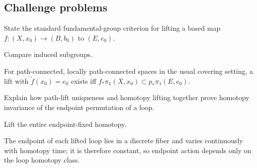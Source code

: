 \subsection*{Challenge problems}

\begin{exercise}\label{exr:viii11-ped-15}
State the standard fundamental-group criterion for lifting a based map $f:(X,x_0)\to(B,b_0)$ to $(E,e_0)$.
\end{exercise}
\begin{hint}
Compare induced subgroups.
\end{hint}
\begin{solution}
For path-connected, locally path-connected spaces in the usual covering setting, a lift with $\widetilde f(x_0)=e_0$ exists iff $f_*\pi_1(X,x_0)\subset p_*\pi_1(E,e_0)$.
\end{solution}

\begin{exercise}\label{exr:viii11-ped-16}
Explain how path-lift uniqueness and homotopy lifting together prove homotopy invariance of the endpoint permutation of a loop.
\end{exercise}
\begin{hint}
Lift the entire endpoint-fixed homotopy.
\end{hint}
\begin{solution}
The endpoint of each lifted loop lies in a discrete fiber and varies continuously with homotopy time; it is therefore constant, so endpoint action depends only on the loop homotopy class.
\end{solution}

